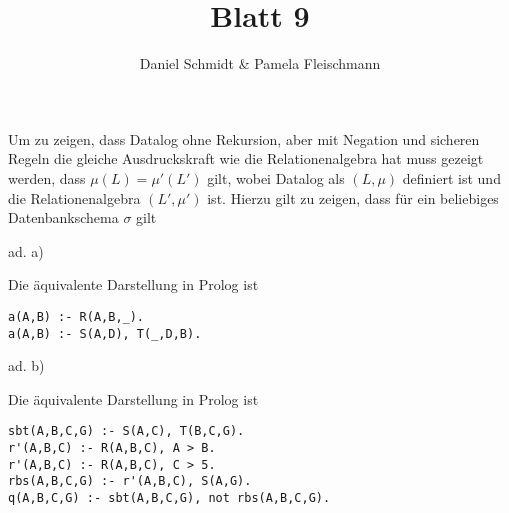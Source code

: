 \documentclass[12pt,a4paper]{amsart}
\begin{document}
\title{Blatt 9}

\author{Daniel Schmidt \& Pamela Fleischmann}

\maketitle

\begin{aufgabe1}
Um zu zeigen, dass Datalog ohne Rekursion, aber mit Negation und sicheren Regeln die gleiche Ausdruckskraft wie die Relationenalgebra hat muss gezeigt werden, dass $\mu(L) = \mu'(L')$ gilt, wobei Datalog als $(L, \mu)$ definiert ist und die Relationenalgebra $(L', \mu')$ ist.
Hierzu gilt zu zeigen, dass für ein beliebiges Datenbankschema $\sigma$ gilt



\end{aufgabe1}


\begin{aufgabe1}
ad. a)

Die äquivalente Darstellung in Prolog ist

\begin{lstlisting}
a(A,B) :- R(A,B,_).
a(A,B) :- S(A,D), T(_,D,B).
\end{lstlisting}

ad. b)

Die äquivalente Darstellung in Prolog ist


\begin{lstlisting}
sbt(A,B,C,G) :- S(A,C), T(B,C,G).
r'(A,B,C) :- R(A,B,C), A > B.
r'(A,B,C) :- R(A,B,C), C > 5.
rbs(A,B,C,G) :- r'(A,B,C), S(A,G).
q(A,B,C,G) :- sbt(A,B,C,G), not rbs(A,B,C,G).
\end{lstlisting}
\end{aufgabe1}

\begin{aufgabe1}
\end{aufgabe1}
\end{document}
